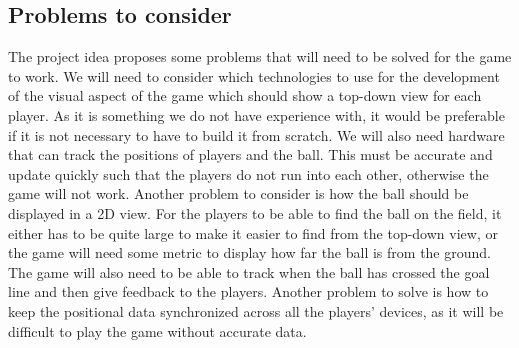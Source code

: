 \subsection{Problems to consider}
The project idea proposes some problems that will need to be solved for the game to work.
We will need to consider which technologies to use for the development of the visual aspect of the game which should show a top-down view for each player. 
As it is something we do not have experience with, it would be preferable if it is not necessary to have to build it from scratch.
We will also need hardware that can track the positions of players and the ball.
This must be accurate and update quickly such that the players do not run into each other, otherwise the game will not work.
Another problem to consider is how the ball should be displayed in a 2D view.
For the players to be able to find the ball on the field, it either has to be quite large to make it easier to find from the top-down view, or the game will need some metric to display how far the ball is from the ground.
The game will also need to be able to track when the ball has crossed the goal line and then give feedback to the players.
Another problem to solve is how to keep the positional data synchronized across all the players' devices, as it will be difficult to play the game without accurate data.
